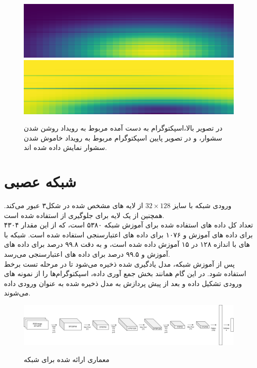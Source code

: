 \documentclass[12pt,onecolumn,a4paper]{article}
\begin{document}
\begin{figure}
	\centering
	\includegraphics[totalheight=3cm]{Images/2.png}\\
	\vspace{5pt}
	\includegraphics[totalheight=3cm]{Images/3.png}
	\caption{در تصویر بالا،اسپکتوگرام به دست آمده مربوط به رویداد روشن شدن سشوار، و در تصویر پایین اسپکتوگرام مربوط به رویداد خاموش شدن سشوار نمایش داده شده اند. }
	\label{fig:data}
\end{figure}

\section{شبکه عصبی}

ورودی شبکه با سایز 
$32 \times 128$
از لایه های مشخص شده در شکل۳ عبور می‌کند. همچنین از یک لایه 
برای جلوگیری از 
استفاده شده است.\\
تعداد کل داده های استفاده شده برای آموزش شبکه ۵۳۸۰ است، که از این مقدار ۴۳۰۴ برای داده های آموزش و ۱۰۷۶ برای داده های اعتبارسنجی استفاده شده است. شبکه با  های با اندازه ۱۲۸ در ۱۵  آموزش داده شده است، و به دقت ۹۹.۸ درصد برای داده های آموزش و ۹۹.۵ درصد برای داده های اعتبارسنجی می‌رسد.\\
پس از آموزش شبکه، مدل یادگیری شده ذخیره می‌شود تا در مرحله تست برخط استفاده شود. در این گام همانند بخش جمع آوری داده، اسپکتوگرام‌ها را از نمونه های ورودی تشکیل داده و بعد از پیش پردازش به مدل ذخیره شده به عنوان ورودی داده می‌شوند.

\begin{figure}
	\centering
	\includegraphics[totalheight=2.7cm]{Images/4.png}\\
	\vspace{5pt}
	\caption{معماری ارائه شده برای شبکه}
	\label{fig:data}
\end{figure}
\end{document}
